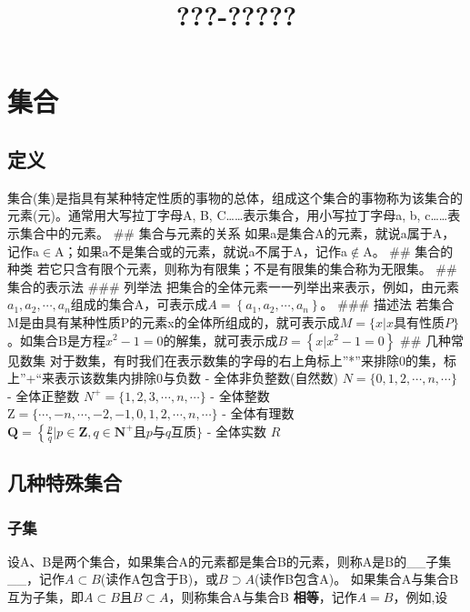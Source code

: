 \documentclass[11pt]{article}
\title{???-?????}
\begin{document}
    
    
    \maketitle
    
    

    
    \section{集合}\label{ux96c6ux5408}

\subsection{定义}\label{ux5b9aux4e49}

集合(集)是指具有某种特定性质的事物的总体，组成这个集合的事物称为该集合的元素(元)。通常用大写拉丁字母A,
B, C\ldots{}\ldots{}表示集合，用小写拉丁字母a, b,
c\ldots{}\ldots{}表示集合中的元素。 \#\# 集合与元素的关系
如果a是集合A的元素，就说a属于A，记作a\(\in\)A；如果a不是集合或的元素，就说a不属于A，记作a\(\notin\)A。
\#\# 集合的种类
若它只含有限个元素，则称为有限集；不是有限集的集合称为无限集。 \#\#
集合的表示法 \#\#\# 列举法
把集合的全体元素一一列举出来表示，例如，由元素\(a_{1}, a_{2}, \cdots, a_{n}\)组成的集合A，可表示成\(A=\left\{a_{1}, a_{2}, \cdots, a_{n}\right\}\)。
\#\#\# 描述法
若集合M是由具有某种性质P的元素x的全体所组成的，就可表示成\(M=\{x | x 具有性质P\}\)。如集合B是方程\(x^{2}-1=0\)的解集，就可表示成\(B=\left\{x | x^{2}-1=0\right\}\)
\#\# 几种常见数集
对于数集，有时我们在表示数集的字母的右上角标上''*''来排除0的集，标上''+``来表示该数集内排除0与负数
- 全体非负整数(自然数) \(N=\{0,1,2, \cdots, n, \cdots\}\) - 全体正整数
\(N^{+}=\{1,2,3, \cdots, n, \cdots\}\) - 全体整数
\(\mathrm{Z}=\{\cdots,-n, \cdots,-2,-1,0,1,2, \cdots, n, \cdots\}\) -
全体有理数
\(\mathbf{Q}=\left\{\frac{p}{q} | p \in \mathbf{Z}, q \in \mathbf{N}^{+}\right. 且p与q互质\}\)
- 全体实数 \(R\)

\subsection{几种特殊集合}\label{ux51e0ux79cdux7279ux6b8aux96c6ux5408}

\subsubsection{子集}\label{ux5b50ux96c6}

设A、B是两个集合，如果集合A的元素都是集合B的元素，则称A是B的\_\_子集\_\_，记作\(A \subset B\)(读作A包含于B)，或\(B \supset A\)(读作B包含A)。
如果集合A与集合B互为子集，即\(A \subset B\)且\(B \subset A\)，则称集合A与集合B
\textbf{相等}，记作\(A = B\)，例如,设
\end{document}
